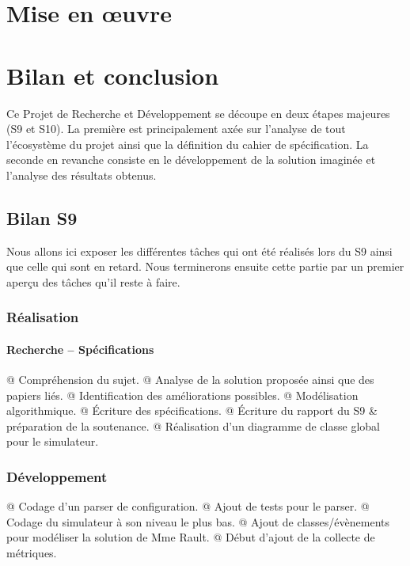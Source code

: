 \documentclass[noposter,final]{polytech/polytech}
\begin{document}
	
\chapter{Mise en œuvre}
	
\chapter{Bilan et conclusion}
	Ce Projet de Recherche et Développement se découpe en deux étapes majeures (S9 et S10).
	La première est principalement axée sur l'analyse de tout l'écosystème du projet ainsi que la définition du cahier de spécification.
	La seconde en revanche consiste en le développement de la solution imaginée et l'analyse des résultats obtenus.
	
	\section{Bilan S9}
		Nous allons ici exposer les différentes tâches qui ont été réalisés lors du S9 ainsi que celle qui sont en retard.
		Nous terminerons ensuite cette partie par un premier aperçu des tâches qu'il reste à faire.
		
		\subsection{Réalisation}
			\subsubsection{Recherche -- Spécifications}
				\begin{easylist}[itemize]
					@ Compréhension du sujet.
					@ Analyse de la solution proposée ainsi que des papiers liés.
					@ Identification des améliorations possibles.
					@ Modélisation algorithmique.
					@ Écriture des spécifications.
					@ Écriture du rapport du S9 \& préparation de la soutenance.
					@ Réalisation d'un diagramme de classe global pour le simulateur.
				\end{easylist}

			\subsection{Développement}
				\begin{easylist}[itemize]
					@ Codage d'un parser de configuration.
					@ Ajout de tests pour le parser.
					@ Codage du simulateur à son niveau le plus bas.
					@ Ajout de classes/évènements pour modéliser la solution de Mme Rault.
					@ Début d'ajout de la collecte de métriques.
				\end{easylist}
\end{document}
